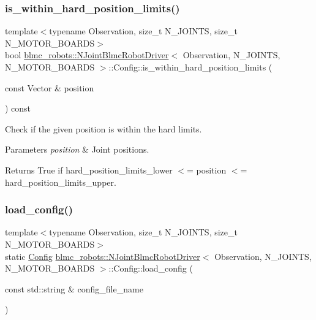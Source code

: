 \subsubsection{\texorpdfstring{is\+\_\+within\+\_\+hard\+\_\+position\+\_\+limits()}{is\_within\_hard\_position\_limits()}}
{\footnotesize\ttfamily template$<$typename Observation, size\+\_\+t N\+\_\+\+J\+O\+I\+N\+TS, size\+\_\+t N\+\_\+\+M\+O\+T\+O\+R\+\_\+\+B\+O\+A\+R\+DS$>$ \\
bool \hyperlink{classblmc__robots_1_1NJointBlmcRobotDriver}{blmc\+\_\+robots\+::\+N\+Joint\+Blmc\+Robot\+Driver}$<$ Observation, N\+\_\+\+J\+O\+I\+N\+TS, N\+\_\+\+M\+O\+T\+O\+R\+\_\+\+B\+O\+A\+R\+DS $>$\+::Config\+::is\+\_\+within\+\_\+hard\+\_\+position\+\_\+limits (\begin{DoxyParamCaption}\item[{const Vector \&}]{position }\end{DoxyParamCaption}) const}



Check if the given position is within the hard limits. 


\begin{DoxyParams}{Parameters}
{\em position} & Joint positions.\\
\hline
\end{DoxyParams}
\begin{DoxyReturn}{Returns}
True if {\ttfamily hard\+\_\+position\+\_\+limits\+\_\+lower $<$= position $<$= hard\+\_\+position\+\_\+limits\+\_\+upper}. 
\end{DoxyReturn}
\mbox{\label{structblmc__robots_1_1NJointBlmcRobotDriver_1_1Config_acd73ca574eacb067ee6a29c6a4a2704a}} 
\subsubsection{\texorpdfstring{load\+\_\+config()}{load\_config()}}
{\footnotesize\ttfamily template$<$typename Observation, size\+\_\+t N\+\_\+\+J\+O\+I\+N\+TS, size\+\_\+t N\+\_\+\+M\+O\+T\+O\+R\+\_\+\+B\+O\+A\+R\+DS$>$ \\
static \hyperlink{structblmc__robots_1_1NJointBlmcRobotDriver_1_1Config}{Config} \hyperlink{classblmc__robots_1_1NJointBlmcRobotDriver}{blmc\+\_\+robots\+::\+N\+Joint\+Blmc\+Robot\+Driver}$<$ Observation, N\+\_\+\+J\+O\+I\+N\+TS, N\+\_\+\+M\+O\+T\+O\+R\+\_\+\+B\+O\+A\+R\+DS $>$\+::Config\+::load\+\_\+config (\begin{DoxyParamCaption}\item[{const std\+::string \&}]{config\+\_\+file\+\_\+name }\end{DoxyParamCaption})\hspace{0.3cm}{\ttfamily [static]}}



